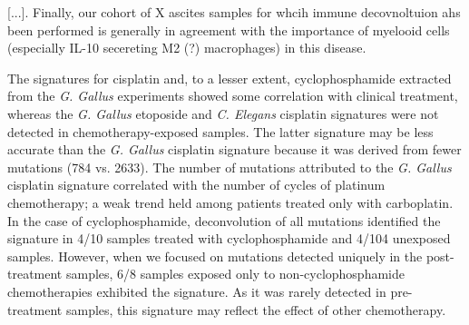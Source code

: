 \documentclass[linenumbers]{bmcart}
\begin{document}
 [...]. Finally, our cohort of X ascites samples for whcih immune decovnoltuion ahs been performed is generally in agreement with the importance of myelooid cells (especially IL-10 secereting M2 (?) macrophages) in this disease.







The signatures for cisplatin and, to a lesser extent, cyclophosphamide extracted from the \textit{G. Gallus} experiments showed some correlation with clinical treatment, whereas the \textit{G. Gallus} etoposide and \textit{C. Elegans} cisplatin signatures were not detected in chemotherapy-exposed samples. The latter signature may be less accurate than the \textit{G. Gallus} cisplatin signature because it was derived from fewer mutations (784 vs. 2633).  The number of mutations attributed to the \textit{G. Gallus} cisplatin signature correlated with the number of cycles of platinum chemotherapy; a weak trend held among patients treated only with carboplatin. In the case of cyclophosphamide, deconvolution of all mutations identified the signature in 4/10 samples treated with cyclophosphamide and 4/104 unexposed samples. However, when we focused on mutations detected uniquely in the post-treatment samples, 6/8 samples exposed only to non-cyclophosphamide chemotherapies exhibited the signature. As it was rarely detected in pre-treatment samples, this signature may reflect the effect of other chemotherapy.
\end{document}
